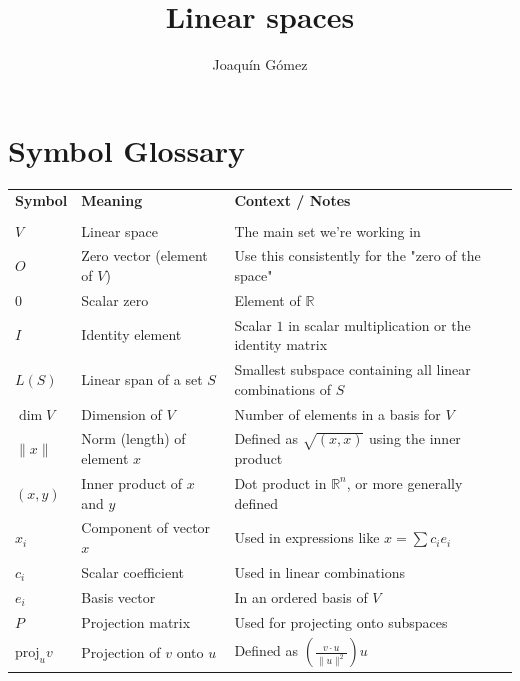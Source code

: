 \documentclass{book}
\title{Linear spaces}
\author{Joaquín Gómez}
\begin{document}
\frontmatter
\maketitle
\tableofcontents

\pagebreak
\section*{Symbol Glossary}
\begin{tabular}{@{}llp{5.5cm}@{}}
    \textbf{Symbol}     & \textbf{Meaning}             & \textbf{Context / Notes}                                    \\
    \\[-0.8em] %
    $V$                 & Linear space                 & The main set we're working in                               \\[1em]
    $O$                 & Zero vector (element of $V$) & Use this consistently for the "zero of the space"           \\[1em]
    $0$                 & Scalar zero                  & Element of $\mathbb{R}$                                     \\[1em]
    $I$                 & Identity element             & Scalar $1$ in scalar multiplication or the identity matrix  \\[1em]
    $L(S)$              & Linear span of a set $S$     & Smallest subspace containing all linear combinations of $S$ \\[1em]
    $\dim V$            & Dimension of $V$             & Number of elements in a basis for $V$                       \\[1em]
    $\|x\|$             & Norm (length) of element $x$ & Defined as $\sqrt{(x, x)}$ using the inner product          \\[1em]
    $(x, y)$            & Inner product of $x$ and $y$ & Dot product in $\mathbb{R}^n$, or more generally defined    \\[1em]
    $x_i$               & Component of vector $x$      & Used in expressions like $x = \sum c_i e_i$                 \\[1em]
    $c_i$               & Scalar coefficient           & Used in linear combinations                                 \\[1em]
    $e_i$               & Basis vector                 & In an ordered basis of $V$                                  \\[1em]
    $P$                 & Projection matrix            & Used for projecting onto subspaces                          \\[1em]
    $\mathrm{proj}_u v$ & Projection of $v$ onto $u$   & Defined as $\left(\frac{v \cdot u}{\|u\|^2}\right) u$       \\[1em]
\end{tabular}
\end{document}
